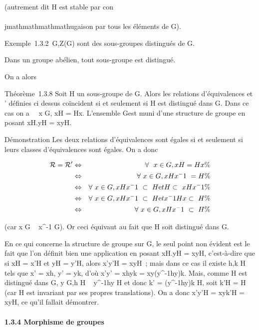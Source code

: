 (autrement dit H est stable par con\\\\jmathmathmathmathugaison par tous les éléments de G).

Exemple~1.3.2 \e\,G,Z(G) sont des
sous-groupes distingués de G.

Dans un groupe abélien, tout sous-groupe est distingué.

On a alors

Théorème~1.3.8 Soit H un sous-groupe de G. Alors les relations
d'équivalences  et ' définies ci dessus coïncident si et seulement si
H est distingué dans G. Dans ce cas on a \forall~~x \in
G, xH = Hx. L'ensemble G\diagupH est muni d'une structure de groupe en posant
xH.yH = xyH.

Démonstration Les deux relations d'équivalences sont égales si et
seulement si leurs classes d'équivalences sont égales. On a donc

\begin{align*} \mathcal{R} = \mathcal{R}'& \Leftrightarrow
& \forall~~x \in G, xH = Hx \%&
\\ & \Leftrightarrow &
\forall~x \in G, xHx^-1~ = H \%&
\\ & \Leftrightarrow &
\forall~x \in G, xHx^-1~ \subset~
H\text et H \subset~ xHx^-1\%&
\\ & \Leftrightarrow &
\forall~x \in G, xHx^-1~ \subset~
H\text et x^-1Hx \subset~ H\%&
\\ & \Leftrightarrow &
\forall~x \in G, xHx^-1~ \subset~ H \%&
\\ \end{align*}

(car x \in G \rigtharrow~ x^-1 \in G). Or ceci équivaut au fait que H soit
distingué dans G.

En ce qui concerne la structure de groupe sur G\diagupH, le seul point non
évident est le fait que l'on définit bien une application en posant
xH.yH = xyH, c'est-à-dire que si xH = x'H et yH = y'H, alors x'y'H =
xyH~; mais dans ce cas il existe h,k \in H tels que x' = xh, y' = yk, d'où
x'y' = xhyk = xy(y^-1hy)k. Mais, comme H est distingué dans
G, y \in G,h \in H \rigtharrow~ y^-1hy \in H et donc k' = (y^-1hy)k
\in H, soit k'H = H (car H est invariant par ses propres translations). On
a donc x'y'H = xyk'H = xyH, ce qu'il fallait démontrer.

\paragraph{1.3.4 Morphisme de groupes}

